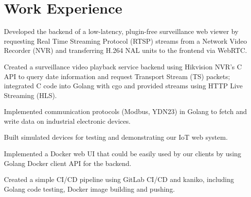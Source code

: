 \documentclass[]{deedy-resume}
\begin{document}
\begin{minipage}[t]{0.66\textwidth} 

\section{Work Experience}

\vspace{\topsep} %
\begin{tightemize}
\item Developed the backend of a low-latency, plugin-free surveillance web viewer
by requesting Real Time Streaming Protocol (RTSP) streams from a Network Video Recorder (NVR) and transferring H.264 NAL units to the frontend via WebRTC.
\item Created a surveillance video playback service backend using Hikvision NVR's C API to query date information and request Transport Stream (TS) packets;
integrated C code into Golang with cgo and provided streams using HTTP Live Streaming (HLS).
\item Implemented communication protocols (Modbus, YDN23) in Golang to fetch and write data on industrial electronic devices.
\item Built simulated devices for testing and demonstrating our IoT web system.
\item Implemented a Docker web UI that could be easily used by our clients
by using Golang Docker client API for the backend.
\item Created a simple CI/CD pipeline using GitLab CI/CD and kaniko, including Golang code testing, Docker image building and pushing.
\end{tightemize}
\sectionsep


\end{minipage}
\end{document}
